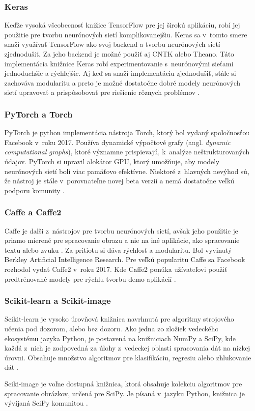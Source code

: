 \subsubsection{Keras}
Keďže vysoká všeobecnosť knižice TensorFlow pre jej širokú aplikáciu, robí jej použitie pre tvorbu neurónových sietí komplikovanejšiu.
Keras sa v~tomto smere snaží využívať TensorFlow ako svoj backend a tvorbu neurónových sietí zjednodušiť.
Za jeho backend je možné použiť aj CNTK alebo Theano.
Táto implementácia knižnice Keras robí experimentovanie s~neurónovými sieťami jednoduchšie a rýchlejšie.
Aj keď sa snaží implementáciu zjednodušiť, stále si zachováva modularitu a preto je možné dostatočne dobré modely neurónových sietí upravovať a prispôsobovať pre riešienie rôznych problémov \cite{odkaz:Keras}.

\subsubsection{PyTorch a Torch}
PyTorch je python implementácia nástroja Torch, ktorý bol vydaný spoločnosťou Facebook v~roku 2017.
Používa dynamické výpočtové grafy (angl. \textit{dynamic computational graphs}), ktoré významne prispievajú, k~analýze neštrukturovaných údajov.
PyTorch si upravil alokátor GPU, ktorý umožňuje, aby modely neurónových sietí boli viac pamäťovo efektívne.
Niektoré z~hlavných nevýhod sú, že nástroj je stále v~porovnateľne novej beta verzií a nemá dostatočne veľkú podporu komunity \cite{odkaz:FrameworkComparison}.

\subsubsection{Caffe a Caffe2}
Caffe je dalši z~nástrojov pre tvorbu neurónových sietí, avšak jeho použitie je priamo mierené pre spracovanie obrazu a nie na iné aplikácie,
    ako spracovanie textu alebo zvuku \cite{odkaz:FrameworkComparison2}.
Za pritiotu si dáva rýchlosť a modularitu. Bol vyvinutý Berkley Artificial Intelligence Research.
Pre veľkú popularitu Caffe sa Facebook rozhodol vydať Caffe2 v~roku 2017.
Kde Caffe2 ponúka užívateľovi použiť predtrénované modely pre rýchlu tvorbu demo aplikácií \cite{odkaz:FrameworkComparison}.

\subsubsection{Scikit-learn a Scikit-image}
Scikit-learn je vysoko úrovňová knižnica navrhnutá pre algoritmy strojového učenia pod dozorom, alebo bez dozoru.
Ako jedna zo zložiek vedeckého ekosystému jazyka Python, je postavená na knižniciach NumPy a SciPy, kde každá z~nich je zodpovedná za úlohy z~vedeckej oblasti spracovania dát na nízkej úrovni.
Obsahuje množstvo algoritmov pre klasifikáciu, regresiu alebo zhlukovanie dát \cite{odkaz:FrameworkComparison3}.

Sciki-image je voľne dostupná knižnica, ktorá obsahuje kolekciu algoritmov pre spracovanie obrázkov, určená pre SciPy.
Je písaná v~jazyku Python, knižnica je vývíjaná SciPy komunitou \cite{prop:scikit-image}.
